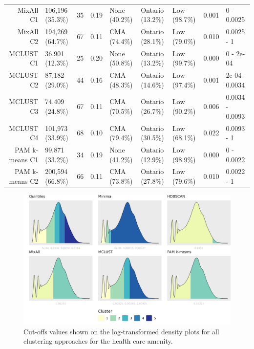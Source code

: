 \documentclass[11pt, a4paper]{article}
\begin{document}
\begin{table}[H]
{\begin{tabular}{|r|llllllll|}
  MixAll C1 & 106,196 (35.3\%) & 35 & 0.19 & None (40.2\%) & Ontario (13.2\%) & Low (98.7\%) & 0.001 & 0 - 0.0025 \\
  MixAll C2 & 194,269 (64.7\%) & 67 & 0.11 & CMA (74.4\%) & Ontario (28.1\%) & Low (79.0\%) & 0.010 & 0.0025 - 1 \\
\rowcolor{gray!25}  MCLUST C1 & 36,901 (12.3\%) & 25 & 0.20 & None (50.8\%) & Ontario (13.2\%) & Low (99.7\%) & 0.000 & 0 - 2e-04 \\
\rowcolor{gray!25}  MCLUST C2 & 87,182 (29.0\%) & 44 & 0.16 & CMA (48.3\%) & Ontario (14.6\%) & Low (97.4\%) & 0.001 & 2e-04 - 0.0034 \\
 \rowcolor{gray!25} MCLUST C3 & 74,409 (24.8\%) & 67 & 0.11 & CMA (70.5\%) & Ontario (26.7\%) & Low (90.2\%) & 0.006 & 0.0034 - 0.0093 \\
 \rowcolor{gray!25} MCLUST C4 & 101,973 (33.9\%) & 68 & 0.10 & CMA (79.4\%) & Ontario (30.5\%) & Low (68.1\%) & 0.022 & 0.0093 - 1 \\
  PAM k-means C1 & 99,871 (33.2\%) & 34 & 0.19 & None (41.2\%) & Ontario (12.9\%) & Low (98.9\%) & 0.000 & 0 - 0.0022 \\
  PAM k-means C2 & 200,594 (66.8\%) & 66 & 0.11 & CMA (73.8\%) & Ontario (27.8\%) & Low (79.6\%) & 0.010 & 0.0022 - 1 \\
   \hline
\end{tabular}
}
\end{table}





\begin{figure}[H]
\centering
\includegraphics[width=\textwidth]{./cutoffs/by_amenity/Health care_cutoffs.png}
\caption[Health care cutoffs]{Cut-offs values shown on the log-transformed density plots for all clustering approaches for the health care amenity.}\label{healthcarecutoffs}
\end{figure}
\end{document}
